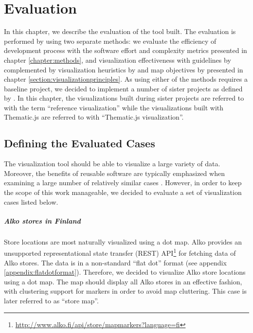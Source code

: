 
\chapter{Evaluation}
\label{chapter:evaluation}

In this chapter, we describe the evaluation of the tool built. The evaluation is performed by using two separate methods: we evaluate the efficiency of development process with the software effort and complexity metrics presented in chapter \ref{chapter:methods}, and visualization effectiveness with guidelines by \citet{kraak_cartographic_1998} complemented by visualization heuristics by \citet{zuk_heuristics_2006} and map objectives by \citet{schlichtmann_visualization_2002} presented in chapter \ref{section:visualizationprinciples}. As using either of the methods requires a baseline project, we decided to implement a number of sister projects as defined by \citet{kitchenham_evaluating_1998}. In this chapter, the visualizations built during sister projects are referred to with the term ``reference visualization'' while the visualizations built with Thematic.js are referred to with ``Thematic.js visualization''. 

\section{Defining the Evaluated Cases}

The visualization tool should be able to visualize a large variety of data. Moreover, the benefits of reusable software are typically emphasized when examining a large number of relatively similar cases \citep{frakes_software_1996}. However, in order to keep the scope of this work manageable, we decided to evaluate a set of visualization cases listed below.

\paragraph{Alko stores in Finland}
Store locations are most naturally visualized using a dot map. Alko provides an unsupported representational state transfer (REST) API\footnote{\url{http://www.alko.fi/api/store/mapmarkers?language=fi}} for fetching data of Alko stores. The data is in a non-standard ``flat dot'' format (see appendix \ref{appendix:flatdotformat}). Therefore, we decided to visualize Alko store locations using a dot map. The map should display all Alko stores in an effective fashion, with clustering support for markers in order to avoid map cluttering. This case is later referred to as ``store map''.

